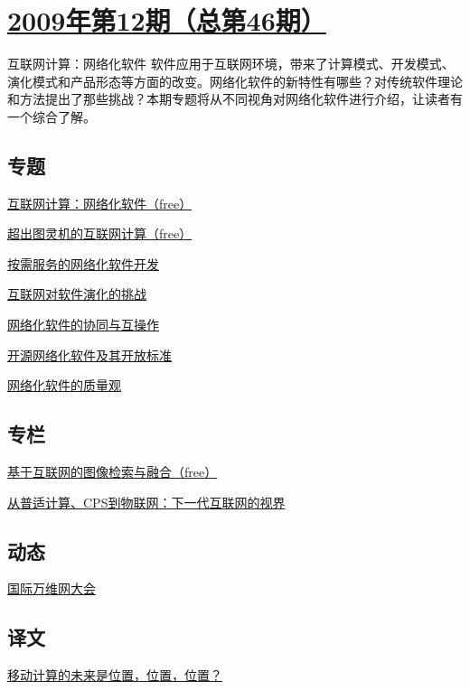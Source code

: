 \documentclass[a4paper]{article}
\begin{document}
\section{\href{http://history.ccf.org.cn/sites/ccf/jsjtbbd.jsp?contentId=2542567629055}{\textbf{2009年第12期（总第46期）}}}
互联网计算：网络化软件 软件应用于互联网环境，带来了计算模式、开发模式、演化模式和产品形态等方面的改变。网络化软件的新特性有哪些？对传统软件理论和方法提出了那些挑战？本期专题将从不同视角对网络化软件进行介绍，让读者有一个综合了解。
\subsection{专题}
\href{http://history.ccf.org.cn/resources/1190201776262/2010/05/18/200912-1.pdf}{互联网计算：网络化软件（free）}

\href{http://history.ccf.org.cn/resources/1190201776262/2010/04/15/046008.pdf}{超出图灵机的互联网计算（free）}

\href{http://history.ccf.org.cn/resources/1190201776262/2010/04/15/046017.pdf}{按需服务的网络化软件开发}

\href{http://history.ccf.org.cn/resources/1190201776262/2010/04/15/046027.pdf}{互联网对软件演化的挑战}

\href{http://history.ccf.org.cn/resources/1190201776262/2010/04/15/046044.pdf}{网络化软件的协同与互操作}

\href{http://history.ccf.org.cn/resources/1190201776262/2010/04/15/046052.pdf}{开源网络化软件及其开放标准}

\href{http://history.ccf.org.cn/resources/1190201776262/2010/04/15/046036.pdf}{网络化软件的质量观}

\subsection{专栏}
\href{http://history.ccf.org.cn/resources/1190201776262/2010/04/15/046060.pdf}{基于互联网的图像检索与融合（free）}

\href{http://history.ccf.org.cn/resources/1190201776262/2010/04/15/046066.pdf}{从普适计算、CPS到物联网：下一代互联网的视界}

\subsection{动态}
\href{http://history.ccf.org.cn/resources/1190201776262/2010/04/15/046070.pdf}{国际万维网大会}

\subsection{译文}
\href{http://history.ccf.org.cn/resources/1190201776262/2010/04/15/046072.pdf}{移动计算的未来是位置，位置，位置？}
\end{document}

